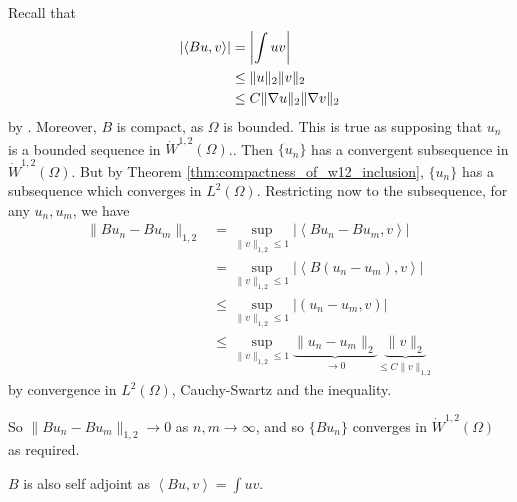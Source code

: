 \documentclass[10pt, oneside, reqno]{amsart}
\theoremstyle{plain}%
\numberwithin{equation}{section}
\theoremstyle{definition}
\theoremstyle{remark}
\newcommand{\iprod}[1]{\left\langle #1 \right\rangle}
\begin{document}
Recall that \begin{align*}
    \left|\iprod{Bu, v}\right| &= \left|\int uv\right| \\
    &\leq \| u \|_2 \| v \|_2 \\
    &\leq C \| \grad u \|_2 \| \grad v \|_2 
\end{align*} by \poincare.  Moreover, $B$ is compact, as $\Omega$ is bounded.  This is true as supposing that $u_n$ is a bounded sequence in $\dot W^{1, 2}(\Omega)$..  Then $\{ u_n \}$ has a convergent subsequence in $\dot W^{1, 2}(\Omega)$.  But by Theorem \ref{thm:compactness_of_w12_inclusion}, $\{ u_n \}$ has a subsequence which converges in $L^2(\Omega)$.  Restricting now to the subsequence, for any $u_n, u_m$, we have \begin{align*}
    \| B u_n - B u_m \|_{1, 2} &= \sup_{\| v \|_{1, 2} \leq 1} \left| \iprod{Bu_n - Bu_m, v} \right| \\
    &= \sup_{\| v \|_{1, 2} \leq 1} \left| \iprod{B(u_n - u_m), v} \right| \\
    &\leq \sup_{\| v \|_{1, 2} \leq 1} \left| (u_n - u_m, v) \right| \\
    &\leq \sup_{\| v \|_{1, 2} \leq 1} \underbrace{\| u_n - u_m \|_2}_{\rightarrow 0} \underbrace{\| v \|_2}_{\leq C \| v \|_{1, 2}} 
\end{align*} by convergence in $L^2(\Omega)$, Cauchy-Swartz and the \poincare inequality.  

So $\| Bu_n - Bu_m \|_{1,2} \rightarrow 0$ as $n,m \rightarrow \infty$, and so $\{ B u_n \}$ converges in $\dot W^{1, 2}(\Omega)$ as required. 

$B$ is also self adjoint as $\iprod{Bu, v} = \int uv$.
\end{document}
